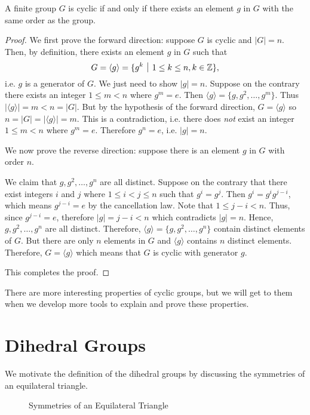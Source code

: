 \begin{theorem}\label{thrm-cyclic-group-has-element-with-same-order}
    A finite group $G$ is cyclic if and only if there exists an element $g$ in $G$ with the same order as the group.
\end{theorem}
\begin{proof}
    We first prove the forward direction: suppose $G$ is cyclic and $|G| = n$. Then, by definition, there exists an element $g$ in $G$ such that
    \[
        G = \langle g \rangle = \{g^k \vert 1 \leq k \leq n, k \in \Z\},
    \]
    i.e. $g$ is a generator of $G$. We just need to show $|g| = n$. Suppose on the contrary there exists an integer $1 \leq m < n$ where $g^m = e$. Then $\langle g \rangle = \{g, g^2, \dots, g^m\}$. Thus $|\langle g \rangle| = m < n = |G|$. But by the hypothesis of the forward direction, $G = \langle g \rangle$ so $n = |G| = |\langle g \rangle| = m$. This is a contradiction, i.e. there does \textit{not} exist an integer $1 \leq m < n$ where $g^m = e$. Therefore $g^n = e$, i.e. $|g| = n$.

    We now prove the reverse direction: suppose there is an element $g$ in $G$ with order $n$.

    We claim that $g, g^2, \dots, g^n$ are all distinct. Suppose on the contrary that there exist integers $i$ and $j$ where $1 \leq i < j \leq n$ such that $g^i = g^j$. Then $g^i = g^ig^{j-i}$, which means $g^{j-i} = e$ by the cancellation law. Note that $1 \leq j - i < n$. Thus, since $g^{j-i} = e$, therefore $|g| = j - i < n$ which contradicts $|g| = n$. Hence, $g, g^2, \dots, g^n$ are all distinct. Therefore, $\langle g \rangle = \{g, g^2, \dots, g^n\}$ contain distinct elements of $G$. But there are only $n$ elements in $G$ and $\langle g \rangle$ contains $n$ distinct elements. Therefore, $G = \langle g \rangle$ which means that $G$ is cyclic with generator $g$.

    This completes the proof.
\end{proof}

There are more interesting properties of cyclic groups, but we will get to them when we develop more tools to explain and prove these properties.

\section{Dihedral Groups}
We motivate the definition of the dihedral groups by discussing the symmetries of an equilateral triangle.

\begin{figure}[h]
    \centering
    \caption{Symmetries of an Equilateral Triangle}
\end{figure}

